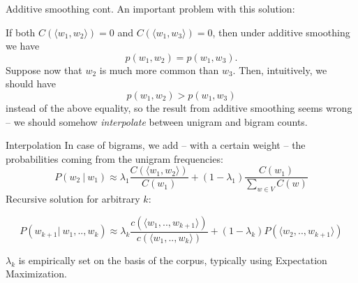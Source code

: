 \documentclass[style=upen, size=14pt]{powerdot}
\theoremstyle{definition}
\begin{document}
\begin{slide}[toc=]{Additive smoothing cont.}
  An important problem with this solution:

  If both $C(\langle w_1,w_2\rangle)=0$ and $C(\langle w_1,w_3\rangle)=0$, then under
  additive smoothing we have 
  $$ p(w_1,w_2)=p(w_1,w_3).$$
  Suppose now that $w_2$ is much more common than $w_3$. Then, intuitively, we
  should have 
  $$ p(w_1,w_2)>p(w_1,w_3)$$
  instead of the above equality, so the result from additive smoothing seems
  wrong -- we should somehow \emph{interpolate} between unigram and bigram
  counts.
\end{slide}

\begin{slide}[toc=Interpolation]{Interpolation}
  In case of bigrams, we add -- with a certain weight -- the probabilities coming
  from the unigram frequencies:
$$P(w_2 ~\vert ~w_1) \approx \lambda_1\frac{C(\langle w_1, w_2 \rangle)}{C(w_1)} + (1 - \lambda_1)\frac{C(w_1)}{\sum_{w\in V}C(w)}$$
Recursive solution for arbitrary $k$:
\begin{small}
$$P(w_{k+1} \vert~ w_1,.., w_k) \approx \lambda_k\frac{c(\langle w_1 ,.., w_{k+1} \rangle)}{c(\langle w_1 ,.., w_k\rangle)} + (1-\lambda_k)P(\langle w_2 ,.., w_{k+1}\rangle)$$
\end{small}
$\lambda_k$ is empirically set on the basis of the corpus, typically using
Expectation Maximization.


\end{slide}
\end{document}
